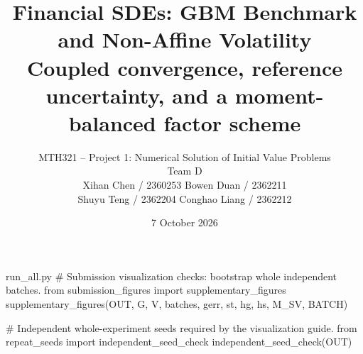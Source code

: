 \begin{filecontents*}[overwrite]{run_all.py}
# Submission visualization checks: bootstrap whole independent batches.
from submission_figures import supplementary_figures
supplementary_figures(OUT, G, V, batches, gerr, st, hg, hs, M_SV, BATCH)

# Independent whole-experiment seeds required by the visualization guide.
from repeat_seeds import independent_seed_check
independent_seed_check(OUT)
\end{filecontents*}

\documentclass[11pt,a4paper]{article}
\usepackage[margin=23mm]{geometry}
\usepackage[T1]{fontenc}
\usepackage{lmodern,amsmath,amssymb,amsthm,booktabs,longtable,array}
\usepackage{graphicx,xcolor,listings,fancyhdr,enumitem,float}
\usepackage{pgfplots}
\usepackage{algorithm,algpseudocode}
\pgfplotsset{compat=1.18}
\usepackage[colorlinks=true,linkcolor=blue!45!black,urlcolor=blue!45!black,citecolor=blue!45!black]{hyperref}
\usepackage[font=small,labelfont=bf]{caption}
\pagestyle{fancy}\fancyhf{}\fancyfoot[C]{\thepage}
\setlength{\headheight}{14pt}
\setlength{\parskip}{4pt}\setlength{\parindent}{0pt}
\setlength{\emergencystretch}{2em}
\newcommand{\E}{\mathbb E}\newcommand{\Var}{\operatorname{Var}}\newcommand{\Cov}{\operatorname{Cov}}\newcommand{\R}{\mathbb R}
\newtheorem{proposition}{Proposition}
\title{\textbf{Financial SDEs: GBM Benchmark and Non-Affine Volatility}\\[5pt]\large Coupled convergence, reference uncertainty, and a moment-balanced factor scheme}
\author{MTH321 -- Project 1: Numerical Solution of Initial Value Problems\\
Team D\\[5pt]\small Xihan Chen / 2360253 \quad Bowen Duan / 2362211\\
\small Shuyu Teng / 2362204 \quad Conghao Liang / 2362212}
\date{7 October 2026}

